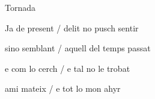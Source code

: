 \documentclass[12pt]{article}
\begin{document}
\begin{estrofaExtra}%




\begin{tornada}

Tornada

\end{tornada}


\end{estrofaExtra}


\begin{estrofa}

 Ja de present / delit no pusch sentir

 sino semblant / aquell del temps passat

 e com lo cerch / e tal no le trobat

 ami mateix / e tot lo mon ahyr

\end{estrofa}
\end{document}
